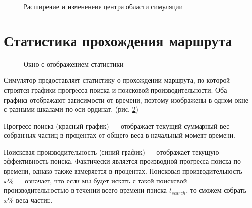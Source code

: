 \begin{figure}[ht]
  \centering
    \caption{Расширение и измененеие центра области симуляции}
    \label{corr:5}
\end{figure}

\section{Статистика прохождения маршрута}
\begin{figure}[ht]
  \centering
    \caption{Окно с отображением статистики}
    \label{stat:0}
\end{figure}

Симулятор предоставляет статистику о прохождении маршрута, по которой строятся графики
прогресса поиска и поисковой производительности. Оба графика отображают зависимости
от времени, поэтому изображены в одном окне с разными шкалами по оси ординат. (рис. \ref{stat:0})

Прогресс поиска (красный график) --- отображает текущий суммарный вес собранных частиц
в процентах от общего веса в начальный момент времени.

Поисковая производительность (синий график) --- отображает текущую эффективность поиска.
Фактически является производной прогресса поиска по времени, однако также измеряется
в процентах. Поисковая производительность $x\%$ --- означает, что если мы будет искать
с такой поисковой производительностью в течении всего времени поиска $t_{search}$,
то сможем собрать $x\%$ веса частиц. 

\FloatBarrier
